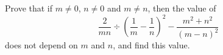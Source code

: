 Prove that if $m\ne0$, $n\ne0$ and $m\ne n$, then the value of
\[
\dfrac{2}{mn}\div\left(\dfrac{1}{m}-\dfrac{1}{n}\right)^2-\dfrac{m^2+n^2}{(m-n)^2}
\]
does not depend on $m$ and $n$, and find this value.
